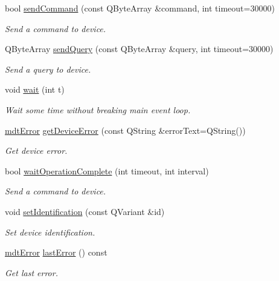 \begin{DoxyCompactItemize}
bool \hyperlink{classmdt_device_scpi_a59759a6138c3ecbcb5cb98a042f8bcb5}{send\-Command} (const Q\-Byte\-Array \&command, int timeout=30000)
\begin{DoxyCompactList}\small\item\em Send a command to device. \end{DoxyCompactList}\item 
Q\-Byte\-Array \hyperlink{classmdt_device_scpi_a6dd5bd26c3178c5ba150d813a91e67c9}{send\-Query} (const Q\-Byte\-Array \&query, int timeout=30000)
\begin{DoxyCompactList}\small\item\em Send a query to device. \end{DoxyCompactList}\item 
void \hyperlink{classmdt_device_scpi_ab0b25fabd466f4e147f5723f2214286b}{wait} (int t)
\begin{DoxyCompactList}\small\item\em Wait some time without breaking main event loop. \end{DoxyCompactList}\item 
\hyperlink{classmdt_error}{mdt\-Error} \hyperlink{classmdt_device_scpi_a45093d4dac06457ee088f45cbec79f3d}{get\-Device\-Error} (const Q\-String \&error\-Text=Q\-String())
\begin{DoxyCompactList}\small\item\em Get device error. \end{DoxyCompactList}\item 
bool \hyperlink{classmdt_device_scpi_aefd45e58d01aed9a165bb2c2dd98198c}{wait\-Operation\-Complete} (int timeout, int interval)
\begin{DoxyCompactList}\small\item\em Send a command to device. \end{DoxyCompactList}\item 
void \hyperlink{classmdt_device_scpi_a88ceddfbca079cb08e9add45296f1475}{set\-Identification} (const Q\-Variant \&id)
\begin{DoxyCompactList}\small\item\em Set device identification. \end{DoxyCompactList}\item 
\hyperlink{classmdt_error}{mdt\-Error} \hyperlink{classmdt_device_scpi_a293c80fcad7f9c38349884717d38027d}{last\-Error} () const 
\begin{DoxyCompactList}\small\item\em Get last error. \end{DoxyCompactList}\end{DoxyCompactItemize}
